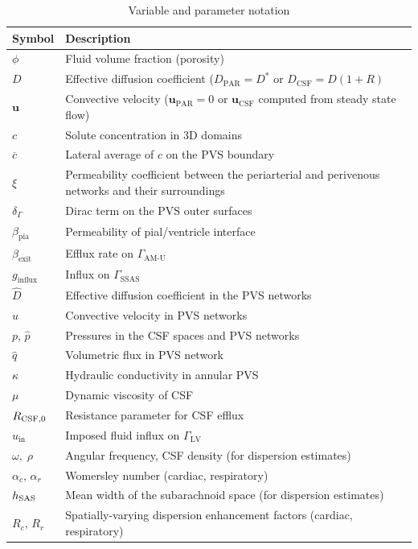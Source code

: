 \documentclass[fleqn,10pt]{wlscirep}
\begin{document}
\begin{table}[htb!]
\centering 
\begin{tabular}{ll}
\toprule
\textbf{Symbol} & \textbf{Description} \\
\midrule
$\phi$ & Fluid volume fraction (porosity) \\
$D$ & Effective diffusion coefficient ($D_{\mathrm{PAR}} = D^*$ or $D_{\mathrm{CSF}} = D(1+R)$ \\
$\mathbf{u}$ & Convective velocity (${\mathbf{u}}_{\mathrm{PAR}} = 0$ or ${\mathbf{u}}_{\mathrm{CSF}}$ computed from steady state flow) \\
$c$ & Solute concentration in 3D domains \\
$\overline{c}$ & Lateral average of $c$ on the PVS boundary \\
$\xi$ & Permeability coefficient between the periarterial and perivenous networks
and their surroundings\\
$\delta_{\Gamma}$ & Dirac term on the PVS outer surfaces \\
$\beta_{\mathrm{pia}}$ & Permeability of pial/ventricle interface \\
$\beta_{\mathrm{exit}}$ & Efflux rate on $\Gamma_{\mathrm{AM\text{-}U}}$ \\
$g_{\mathrm{influx}}$ & Influx on $\Gamma_{\mathrm{SSAS}}$ \\
$\hat D$ & Effective diffusion coefficient in the PVS networks \\
$\hat u$ & Convective velocity in PVS networks \\
$p$, $\hat{p}$ & Pressures in the CSF spaces and PVS networks \\
$\hat{q}$ & Volumetric flux in PVS network \\
$\kappa$ & Hydraulic conductivity in annular PVS \\
$\mu$ & Dynamic viscosity of CSF \\
$R_{\rm CSF, 0}$ & Resistance parameter for CSF efflux \\
$u_{\mathrm{in}}$ & Imposed fluid influx on $\Gamma_{\mathrm{LV}}$ \\
$\omega,\;\rho$ & Angular frequency, CSF density (for dispersion estimates) \\
$\alpha_c,\, \alpha_r$ & Womersley number (cardiac, respiratory) \\
$h_{\rm SAS}$ & Mean width of the subarachnoid space (for dispersion estimates) \\
$R_c,\,R_r$ & Spatially-varying dispersion enhancement factors (cardiac, respiratory) \\
\bottomrule
\end{tabular}
\caption{Variable and parameter notation}
\label{table:variable}
\end{table}
\end{document}
